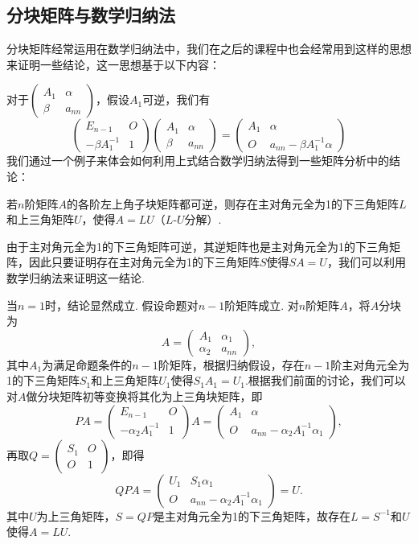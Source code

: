 \subsection{分块矩阵与数学归纳法}

分块矩阵经常运用在数学归纳法中，我们在之后的课程中也会经常用到这样的思想来证明一些结论，这一思想基于以下内容：

对于$\begin{pmatrix}
        A_1 & \alpha \\ \beta & a_{nn}
    \end{pmatrix}$，假设$A_1$可逆，我们有
\[\begin{pmatrix}
        E_{n-1} & O \\ -\beta A_1^{-1} & 1
    \end{pmatrix}\begin{pmatrix}
        A_1 & \alpha \\ \beta & a_{nn}
    \end{pmatrix}=\begin{pmatrix}
        A_1 & \alpha \\ O & a_{nn}-\beta A_1^{-1}\alpha
    \end{pmatrix}\]
我们通过一个例子来体会如何利用上式结合数学归纳法得到一些矩阵分析中的结论：
\begin{example}
    若$n$阶矩阵$A$的各阶左上角子块矩阵都可逆，则存在主对角元全为1的下三角矩阵$L$和上三角矩阵$U$，使得$A=LU$（$L$-$U$分解）.
\end{example}

\begin{solution}
    由于主对角元全为1的下三角矩阵可逆，其逆矩阵也是主对角元全为1的下三角矩阵，因此只要证明存在主对角元全为1的下三角矩阵$S$使得$SA=U$，我们可以利用数学归纳法来证明这一结论.

    当$n=1$时，结论显然成立. 假设命题对$n-1$阶矩阵成立. 对$n$阶矩阵$A$，将$A$分块为
    \[A=\begin{pmatrix}
        A_1 & \alpha_1 \\ \alpha_2 & a_{nn}
    \end{pmatrix},\]
    其中$A_1$为满足命题条件的$n-1$阶矩阵，根据归纳假设，存在$n-1$阶主对角元全为1的下三角矩阵$S_1$和上三角矩阵$U_1$使得$S_1A_1=U_1$.根据我们前面的讨论，我们可以对$A$做分块矩阵初等变换将其化为上三角块矩阵，即
    \[PA=\begin{pmatrix}
        E_{n-1} & O \\ -\alpha_2A_1^{-1} & 1
    \end{pmatrix}A=\begin{pmatrix}
        A_1 & \alpha \\ O & a_{nn}-\alpha_2A_1^{-1}\alpha_1
    \end{pmatrix},\]
    再取$Q=\begin{pmatrix}
        S_1 & O \\ O & 1
    \end{pmatrix}$，即得
    \[QPA=\begin{pmatrix}
        U_1 & S_1\alpha_1 \\ O & a_{nn}-\alpha_2A_1^{-1}\alpha_1
    \end{pmatrix}=U.\]
    其中$U$为上三角矩阵，$S=QP$是主对角元全为1的下三角矩阵，故存在$L=S^{-1}$和$U$使得$A=LU$.
\end{solution}

